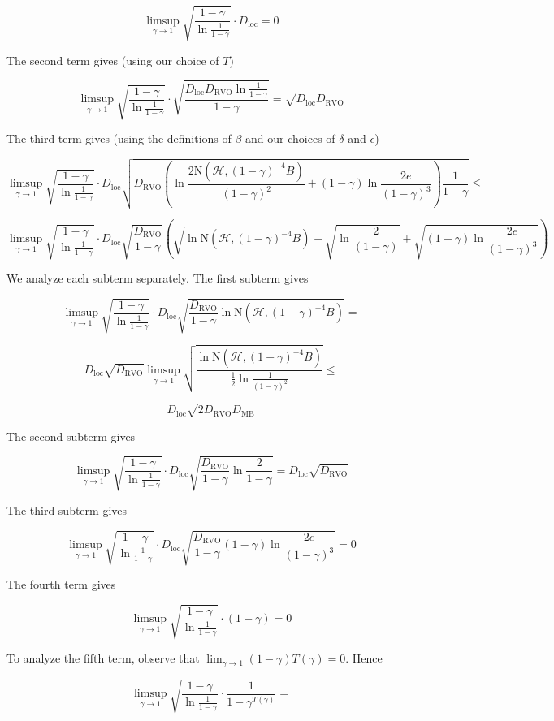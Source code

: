 \documentclass[a4paper]{article}
\newcommand{\AP}[1]{\left(#1\right)}
\newcommand{\B}{B}
\newcommand{\Hy}{\mathcal{H}}
\newcommand{\DRVO}{D_{\mathrm{RVO}}}
\newcommand{\DMB}{D_{\mathrm{MB}}}
\newcommand{\DL}{D_{\mathrm{loc}}}
\newcommand{\N}{\mathrm{N}}
\begin{document}
$$\limsup_{\gamma\rightarrow1}{\sqrt{\frac{1-\gamma}{\ln{\frac{1}{1-\gamma}}}}\cdot\DL} = 0$$

The second term gives (using our choice of $T$)

$$\limsup_{\gamma\rightarrow1}{\sqrt{\frac{1-\gamma}{\ln{\frac{1}{1-\gamma}}}}\cdot\sqrt{\frac{\DL\DRVO\ln{\frac{1}{1-\gamma}}}{1-\gamma}}} = \sqrt{\DL\DRVO}$$

The third term gives (using the definitions of $\beta$ and our choices of $\delta$ and $\epsilon$)

$$\limsup_{\gamma\rightarrow1}{\sqrt{\frac{1-\gamma}{\ln{\frac{1}{1-\gamma}}}}\cdot\DL\sqrt{\DRVO\AP{\ln{\frac{2\N\AP{\Hy,(1-\gamma)^{-4}\B}}{(1-\gamma)^2}}+(1-\gamma) \ln{\frac{2e}{(1-\gamma)^3}}}\frac{1}{1-\gamma}}}\leq$$

$$\limsup_{\gamma\rightarrow1}{\sqrt{\frac{1-\gamma}{\ln{\frac{1}{1-\gamma}}}}\cdot\DL\sqrt{\frac{\DRVO}{1-\gamma}}\AP{\sqrt{\ln {\N\AP{\Hy,(1-\gamma)^{-4}\B}}}+\sqrt{\ln{\frac{2}{(1-\gamma)}}}+\sqrt{(1-\gamma) \ln{\frac{2e}{(1-\gamma)^3}}}}}$$

We analyze each subterm separately. The first subterm gives

$$\limsup_{\gamma\rightarrow1}{\sqrt{\frac{1-\gamma}{\ln{\frac{1}{1-\gamma}}}}\cdot\DL\sqrt{\frac{\DRVO}{1-\gamma}\ln{\N\AP{\Hy,(1-\gamma)^{-4}\B }}}}=$$

$$\DL\sqrt{\DRVO}\limsup_{\gamma\rightarrow1}{\sqrt{\frac{\ln{\N\AP{\Hy,(1-\gamma)^{-4}\B}}}{\frac{1}{2}\ln{\frac{1}{(1-\gamma)^2}}}}}\leq$$

$$\DL\sqrt{2\DRVO\DMB}$$

The second subterm gives

$$\limsup_{\gamma\rightarrow1}{\sqrt{\frac{1-\gamma}{\ln{\frac{1}{1-\gamma}}}}\cdot\DL\sqrt{\frac{\DRVO}{1-\gamma}\ln{\frac{2}{1-\gamma}}}}=\DL\sqrt{\DRVO}$$

The third subterm gives

$$\limsup_{\gamma\rightarrow1}{\sqrt{\frac{1-\gamma}{\ln{\frac{1}{1-\gamma}}}}\cdot\DL\sqrt{\frac{\DRVO}{1-\gamma}(1-\gamma) \ln{\frac{2e}{(1-\gamma)^3}}}}=0$$

The fourth term gives

$$\limsup_{\gamma\rightarrow1}{\sqrt{\frac{1-\gamma}{\ln{\frac{1}{1-\gamma}}}}\cdot(1-\gamma)}=0$$

To analyze the fifth term, observe that $\lim_{\gamma\rightarrow1}{(1-\gamma)T(\gamma)}=0$. Hence

$$\limsup_{\gamma\rightarrow1}{\sqrt{\frac{1-\gamma}{\ln{\frac{1}{1-\gamma}}}}\cdot\frac{1}{1-\gamma^{T(\gamma)}}}=$$
\end{document}
